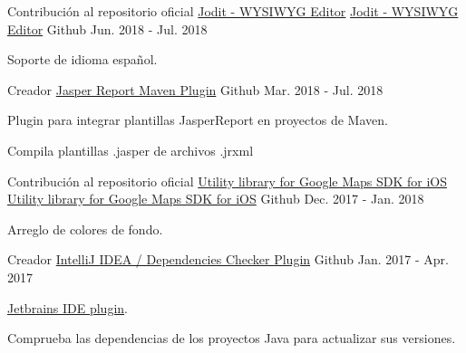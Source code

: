\begin{cventries}
  \cventry
    {Contribución al repositorio oficial \href{https://github.com/xdan/jodit}{Jodit - WYSIWYG Editor}} %
    {\href{https://github.com/zp1ke/jodit}{Jodit - WYSIWYG Editor}} %
    {\faGithubSquare\acvHeaderIconSep Github} %
    {Jun. 2018 - Jul. 2018} %
    {
      \begin{cvitems} %
        \item {Soporte de idioma español.}
      \end{cvitems}
    }

  \cventry
    {Creador} %
    {\href{https://github.com/zp1ke/jasperreport-maven-plugin}{Jasper Report Maven Plugin}} %
    {\faGithubSquare\acvHeaderIconSep Github} %
    {Mar. 2018 - Jul. 2018} %
    {
      \begin{cvitems} %
        \item {Plugin para integrar plantillas JasperReport en proyectos de Maven.}
        \item {Compila plantillas .jasper de archivos .jrxml}
      \end{cvitems}
    }

  \cventry
    {Contribución al repositorio oficial \href{https://github.com/googlemaps/google-maps-ios-utils}{Utility library for Google Maps SDK for iOS}} %
    {\faMapMarker \hphantom{-} \href{https://github.com/zp1ke/google-maps-ios-utils}{Utility library for Google Maps SDK for iOS}} %
    {\faGithubSquare\acvHeaderIconSep Github} %
    {Dec. 2017 - Jan. 2018} %
    {
      \begin{cvitems} %
        \item {Arreglo de colores de fondo.}
      \end{cvitems}
    }

  \cventry
    {Creador} %
    {\href{https://github.com/zp1ke/deps-checker}{IntelliJ IDEA / Dependencies Checker Plugin}} %
    {\faGithubSquare\acvHeaderIconSep Github} %
    {Jan. 2017 - Apr. 2017} %
    {
      \begin{cvitems} %
        \item {\href{https://plugins.jetbrains.com/plugin/9481-java-dependencies-checker}{Jetbrains IDE plugin}.}
        \item {Comprueba las dependencias de los proyectos Java para actualizar sus versiones.}
      \end{cvitems}
    }


\end{cventries}
